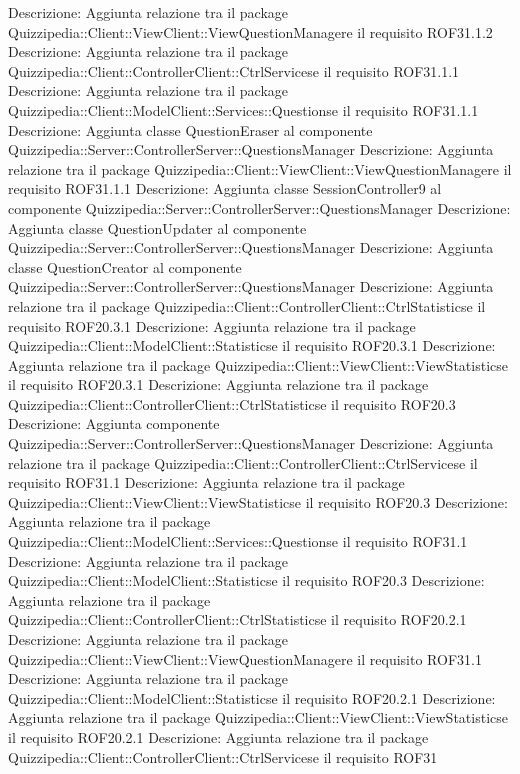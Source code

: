 Descrizione: Aggiunta relazione tra il package Quizzipedia::Client::ViewClient::ViewQuestionManagere il requisito ROF31.1.2 
Descrizione: Aggiunta relazione tra il package Quizzipedia::Client::ControllerClient::CtrlServicese il requisito ROF31.1.1 
Descrizione: Aggiunta relazione tra il package Quizzipedia::Client::ModelClient::Services::Questionse il requisito ROF31.1.1 
Descrizione: Aggiunta classe QuestionEraser al componente Quizzipedia::Server::ControllerServer::QuestionsManager 
Descrizione: Aggiunta relazione tra il package Quizzipedia::Client::ViewClient::ViewQuestionManagere il requisito ROF31.1.1 
Descrizione: Aggiunta classe SessionController9 al componente Quizzipedia::Server::ControllerServer::QuestionsManager 
Descrizione: Aggiunta classe QuestionUpdater al componente Quizzipedia::Server::ControllerServer::QuestionsManager 
Descrizione: Aggiunta classe QuestionCreator al componente Quizzipedia::Server::ControllerServer::QuestionsManager 
Descrizione: Aggiunta relazione tra il package Quizzipedia::Client::ControllerClient::CtrlStatisticse il requisito ROF20.3.1 
Descrizione: Aggiunta relazione tra il package Quizzipedia::Client::ModelClient::Statisticse il requisito ROF20.3.1 
Descrizione: Aggiunta relazione tra il package Quizzipedia::Client::ViewClient::ViewStatisticse il requisito ROF20.3.1 
Descrizione: Aggiunta relazione tra il package Quizzipedia::Client::ControllerClient::CtrlStatisticse il requisito ROF20.3 
Descrizione: Aggiunta componente Quizzipedia::Server::ControllerServer::QuestionsManager 
Descrizione: Aggiunta relazione tra il package Quizzipedia::Client::ControllerClient::CtrlServicese il requisito ROF31.1 
Descrizione: Aggiunta relazione tra il package Quizzipedia::Client::ViewClient::ViewStatisticse il requisito ROF20.3 
Descrizione: Aggiunta relazione tra il package Quizzipedia::Client::ModelClient::Services::Questionse il requisito ROF31.1 
Descrizione: Aggiunta relazione tra il package Quizzipedia::Client::ModelClient::Statisticse il requisito ROF20.3 
Descrizione: Aggiunta relazione tra il package Quizzipedia::Client::ControllerClient::CtrlStatisticse il requisito ROF20.2.1 
Descrizione: Aggiunta relazione tra il package Quizzipedia::Client::ViewClient::ViewQuestionManagere il requisito ROF31.1 
Descrizione: Aggiunta relazione tra il package Quizzipedia::Client::ModelClient::Statisticse il requisito ROF20.2.1 
Descrizione: Aggiunta relazione tra il package Quizzipedia::Client::ViewClient::ViewStatisticse il requisito ROF20.2.1 
Descrizione: Aggiunta relazione tra il package Quizzipedia::Client::ControllerClient::CtrlServicese il requisito ROF31 
